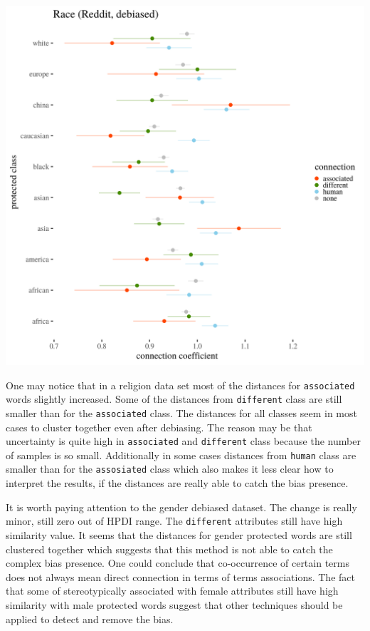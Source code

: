 \documentclass[12pt,]{book}
\begin{document}
\includegraphics[width=14cm]{../images/visDebRaceReddit.png}

One may notice that in a religion data set most of the distances for
\texttt{associated} words slightly increased. Some of the distances from
\texttt{different} class are still smaller than for the
\texttt{associated} class. The distances for all classes seem in most
cases to cluster together even after debiasing. The reason may be that
uncertainty is quite high in \texttt{associated} and \texttt{different}
class because the number of samples is so small. Additionally in some
cases distances from \texttt{human} class are smaller than for the
\texttt{assosiated} class which also makes it less clear how to
interpret the results, if the distances are really able to catch the
bias presence.

It is worth paying attention to the gender debiased dataset. The change
is really minor, still zero out of HPDI range. The \texttt{different}
attributes still have high similarity value. It seems that the distances
for gender protected words are still clustered together which suggests
that this method is not able to catch the complex bias presence. One
could conclude that co-occurrence of certain terms does not always mean
direct connection in terms of terms associations. The fact that some of
stereotypically associated with female attributes still have high
similarity with male protected words suggest that other techniques
should be applied to detect and remove the bias.
\end{document}
